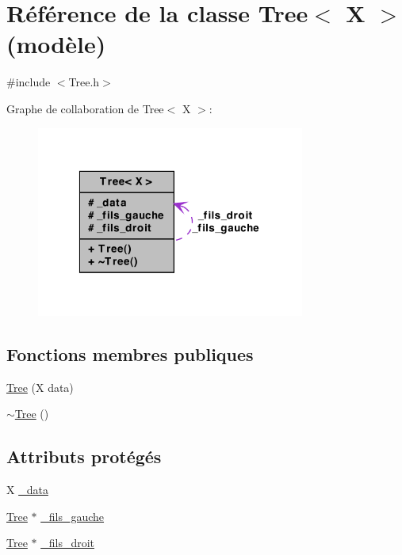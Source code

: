 \hypertarget{a00015}{
\section{Référence de la classe Tree$<$ X $>$ (modèle)}
\label{a00015}
}


{\ttfamily \#include $<$Tree.h$>$}



Graphe de collaboration de Tree$<$ X $>$:
\nopagebreak
\begin{figure}[H]
\begin{center}
\leavevmode
\includegraphics[width=250pt]{a00097}
\end{center}
\end{figure}
\subsection*{Fonctions membres publiques}
\begin{DoxyCompactItemize}
\item 
\hyperlink{a00015_afb7bcefb7f00ce33332974feabbd2b6c}{Tree} (X data)
\item 
\hyperlink{a00015_aee58141b349de68d37e821641edbadcd}{$\sim$Tree} ()
\end{DoxyCompactItemize}
\subsection*{Attributs protégés}
\begin{DoxyCompactItemize}
\item 
X \hyperlink{a00015_aa51d916644614563a7f0d8c288bea693}{\_\-data}
\item 
\hyperlink{a00015}{Tree} $\ast$ \hyperlink{a00015_a9d6367bd5298cc1a78a6dd994341ada3}{\_\-fils\_\-gauche}
\item 
\hyperlink{a00015}{Tree} $\ast$ \hyperlink{a00015_afd3adaf706139ee52b43262a76400f30}{\_\-fils\_\-droit}
\end{DoxyCompactItemize}


